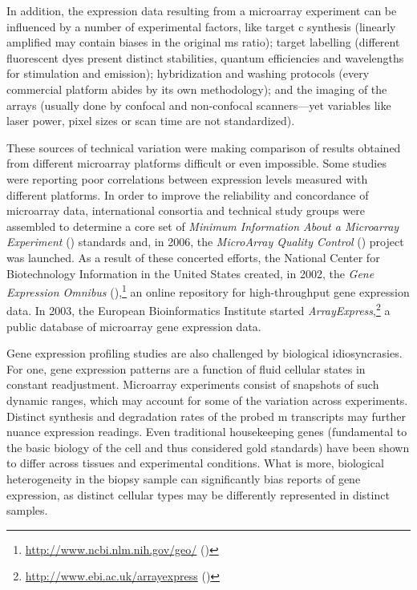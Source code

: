 \medskip

In addition, the expression data resulting from a microarray experiment can be
influenced by a number of experimental factors, like target c
synthesis (linearly amplified  may contain biases in the original
ms ratio);\cite{nygaard_options_2006} target labelling (different
fluorescent dyes present distinct stabilities, quantum efficiencies and
wavelengths for stimulation and emission); hybridization and washing protocols
(every commercial platform abides by its own methodology); and the imaging of
the arrays (usually done by confocal and non-confocal scanners---yet variables
like laser power, pixel sizes or scan time are not standardized).

These sources of technical variation were making comparison of results obtained
from different microarray platforms difficult or even impossible.  Some studies
were reporting poor correlations between expression levels measured with
different platforms.\cite{tan_evaluation_2003,shi_cross-platform_2005} In order
to improve the reliability and concordance of microarray data, international
consortia and technical study groups were assembled to determine a core set of
\emph{Minimum Information About a Microarray Experiment} ()
standards\cite{brazma_minimum_2001} and, in 2006, the \emph{MicroArray Quality
  Control} () project was
launched.\cite{maqc_consortium_microarray_2006} As a result of these concerted
efforts, the National Center for Biotechnology Information in the United States
created, in 2002, the \emph{Gene Expression Omnibus}
(),\footnote{\url{http://www.ncbi.nlm.nih.gov/geo/}
  (\citealp{edgar_gene_2002})} an online repository for \mbox{high-throughput}
gene expression data.  In 2003, the European Bioinformatics Institute started
\emph{ArrayExpress},\footnote{\url{http://www.ebi.ac.uk/arrayexpress}
  (\citealp{brazma_arrayexpress--public_2003})} a public database of microarray
gene expression data.

Gene expression profiling studies are also challenged by biological
idiosyncrasies.  For one, gene expression patterns are a function of fluid
cellular states in constant readjustment.  Microarray experiments consist of
snapshots of such dynamic ranges, which may account for some of the variation
across experiments.  Distinct synthesis and degradation rates of the probed
m transcripts may further nuance expression readings.  Even
traditional housekeeping genes (fundamental to the basic biology of the cell and
thus considered gold standards) have been shown to differ across tissues and
experimental conditions.\cite{thorrez_using_2008} What is more, biological
heterogeneity in the biopsy sample can significantly bias reports of gene
expression, as distinct cellular types may be differently represented in
distinct samples.

